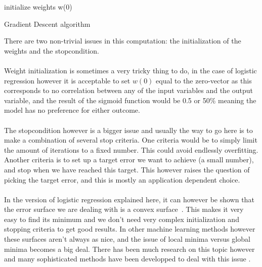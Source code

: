 \vspace{1em}
\begin{algorithm}[H]
	initialize weights w(0) \\
\SetAlCapSkip{1em}
\caption{Gradient Descent algorithm}
\end{algorithm}
\vspace{1em}
There are two non-trivial issues in this computation: the initialization of the weights and the stopcondition. \\ \\
Weight initialization is sometimes a very tricky thing to do, in the case of logistic regression however it is acceptable to set $w(0)$ equal to the zero-vector as this corresponds to no correlation between any of the input variables and the output variable, and the result of the sigmoid function would be 0.5 or 50\% meaning the model has no preference for either outcome.\\ \\
The stopcondition however is a bigger issue and usually the way to go here is to make a combination of several stop criteria. One criteria would be to simply limit the amount of iterations to a fixed number. This could avoid endlessly overfitting. Another criteria is to set up a target error we want to achieve (a small number), and stop when we have reached this target. This however raises the question of picking the target error, and this is mostly an application dependent choice. \\ \\
In the version of logistic regression explained here, it can however be shown that the error surface we are dealing with is a convex surface~\cite{convexerrorlogistic}. This makes it very easy to find its minimum and we don't need very complex initialization and stopping criteria to get good results. In other machine learning methods however these surfaces aren't always as nice, and the issue of local minima versus global minima becomes a big deal. There has been much research on this topic however and many sophisticated methods have been developped to deal with this issue \cite{jones2001taxonomy}.
